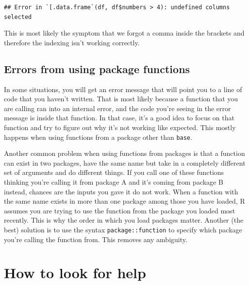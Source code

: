 \documentclass[
]{book}
\newenvironment{Shaded}{\begin{snugshade}}{\end{snugshade}}
\newcommand{\DecValTok}[1]{\textcolor[rgb]{0.00,0.00,0.81}{#1}}
\newcommand{\NormalTok}[1]{#1}
\newcommand{\SpecialCharTok}[1]{\textcolor[rgb]{0.81,0.36,0.00}{\textbf{#1}}}
\begin{document}
\begin{Shaded}
\end{Shaded}

\begin{verbatim}
## Error in `[.data.frame`(df, df$numbers > 4): undefined columns selected
\end{verbatim}

This is most likely the symptom that we forgot a comma inside the brackets and
therefore the indexing isn't working correctly.

\hypertarget{errors-from-using-package-functions}{%
\subsection{Errors from using package functions}\label{errors-from-using-package-functions}}

In some situations, you will get an error message that will point you to a line
of code that you haven't written. That is most likely because a function that
you are calling ran into an internal error, and the code you're seeing in the
error message is inside that function. In that case, it's a good idea to focus
on that function and try to figure out why it's not working like expected. This
mostly happens when using functions from a package other than \texttt{base}.

Another common problem when using functions from packages is that a function can
exist in two packages, have the same name but take in a completely different set
of arguments and do different things. If you call one of these functions
thinking you're calling it from package A and it's coming from package B instead,
chances are the inputs you gave it do not work. When a function with the same
name exists in more than one package among those you have loaded, R assumes you
are trying to use the function from the package you loaded most recently. This
is why the order in which you load packages matter. Another (the best) solution
is to use the syntax \texttt{package::function} to specify which package you're calling
the function from. This removes any ambiguity.

\hypertarget{how-to-look-for-help}{%
\section{How to look for help}\label{how-to-look-for-help}}
\end{document}
